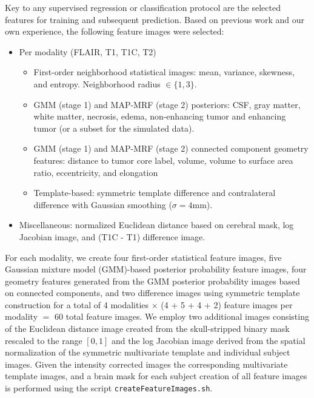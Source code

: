 \documentclass[final,5p,times,twocolumn]{elsarticle}
\begin{document}
Key to any supervised regression or classification protocol are the 
selected features for training and subsequent prediction.  Based on previous
work and our own experience, the following feature images were selected:
\begin{itemize}
  \item Per modality (FLAIR, T1, T1C, T2)
    \begin{itemize}
      \item First-order neighborhood statistical images:
            mean, variance, skewness, and entropy. 
            Neighborhood radius $\in \{1,3\}$.
    \item GMM (stage 1) and MAP-MRF (stage 2) posteriors: CSF, gray matter, white 
          matter, necrosis, edema, non-enhancing tumor and enhancing tumor (or a
          subset for the simulated data).
    \item GMM (stage 1) and MAP-MRF (stage 2) connected component geometry 
          features:  distance to tumor core label, volume, volume to surface area ratio, eccentricity, and elongation
    \item Template-based:  symmetric template difference and 
          contralateral difference with Gaussian smoothing ($\sigma = 4$mm).
    \end{itemize}
  \item Miscellaneous: normalized Euclidean distance based on cerebral mask,
    log Jacobian image, and  (T1C - T1) difference image.
\end{itemize}






For each modality, we create four first-order statistical feature images,
five Gaussian mixture model (GMM)-based posterior probability feature images,
four geometry features generated from the GMM posterior probability images
based on connected components, and two difference images using symmetric template
construction for a total of 4 modalities $\times$ (4 + 5 + 4 + 2) feature images per modality $=$ 60 total
feature images.  We employ two additional images consisting of the 
Euclidean distance image \cite{maurer2003} created from the skull-stripped 
binary mask rescaled to the range $[0,1]$ and the log
Jacobian image derived from the spatial normalization of the symmetric multivariate template and individual subject images.  Given the intensity corrected images
the corresponding multivariate template images, and a brain mask for each subject
creation of all feature images is performed using the script \verb#createFeatureImages.sh#.
\end{document}
